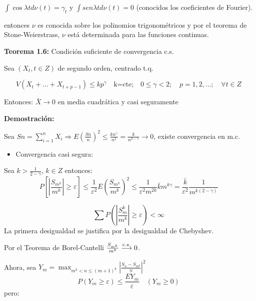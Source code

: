 $\int {\cos \lambda t d\nu (t)=\gamma_{t} }$ y $\int {sen\lambda td\nu \left( t \right)=0} $ (conocidos los coeficientes de Fourier).\newline

entonces $\nu$ es conocida sobre los polinomios trigonom\'{e}tricos y por el teorema de Stone-Weierstrass, $\nu $ est\'{a} determinada para las funciones continuas.\newline

\textbf{Teorema 1.6: }Condici\'{o}n suficiente de convergencia c.s.\newline

Sea $\left(X_{t}, t\in Z \right)$ de segundo orden, centrado t.q.

\[
V\left(X_{t} +\ldots+X_{t+p-1} \right)\leq kp^{\gamma}\quad \text{k=cte;}\quad 0\leq \gamma <2;\quad p=1,2,\ldots; \quad \forall t\in Z
\]

Entonces: $\bar{{X}}\to 0$ en media cuadr\'{a}tica y casi seguramente 

\textbf{Demostraci\'{o}n:}\newline

Sea $Sn=\sum\limits_{i=1}^n X_{i} \Rightarrow E\left(\frac{Sn}{n} \right)^{2}\leq \frac{kn^{\gamma}}{n^{2}}=\frac{k}{n^{2-\gamma }}\to 0$, existe convergencia en m.c.

\begin{itemize}
\item Convergencia casi segura:
\end{itemize}

Sea $k>\frac{1}{2-\gamma}$, $k\in Z$ entonces: 
\[
P\left[\left|\frac{S_{m^k}}{m^k} \right|\geq \varepsilon \right] \leq \frac{1}{\varepsilon^2} E\left(\frac{S_{m^k} }{m^k} \right)^{2} \leq \frac{1}{\varepsilon^{2} m^{2k}}\bar{k}m^{k\gamma } = \frac{\bar{k}}{\varepsilon^{2}}\frac{1}{m^{k(2-\gamma)}}
\]

\[
\sum P\left(\left|\frac{S_{m}^k}{m^k} \right|\geq \varepsilon \right) <\infty 
\]
La primera desigualdad se justifica por la desigualdad de Chebyshev.\newline

Por el Teorema de Borel-Cantelli $\frac{S_{m^k} }{m^k}\buildrel {c.s.} \over \longrightarrow 0$.\newline 

Ahora, sea $Y_{m} =\max_{m^k < n\leq (m+1)^k} \left|\frac{S_{n} -S_{m^k}}{n} \right|^2$
\[
P\left(Y_{m} \geq \varepsilon \right)\leq \frac{EY_{m} }{\varepsilon}\quad \left( {Y_{m} \geq 0} \right)
\]
pero: 

